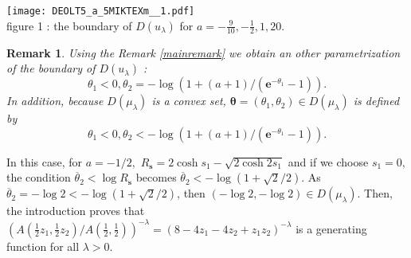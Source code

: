 \documentclass[a4paper,oneside,notitlepage]{article}%
\newtheorem{remark}[theorem]{Remark}
\begin{document}

\begin{center}
\texttt{[image: DEOLT5\_a\_5MIKTEXm\_\_1.pdf]}
\\
figure 1 : the boundary of $D\left(  u_{\lambda}\right)  $ for $a=-\frac
{9}{10},-\frac{1}{2},1,20.$%
\label{fig1}%



\end{center}


\begin{remark}
Using the Remark \ref{mainremark} we obtain an other parametrization of the
boundary of $D\left(  u_{\lambda}\right)  $ :
\[
\theta_{1}<0,\theta_{2}=-\log\left(  1+\left(  a+1\right)  /\left(
\mathbf{e}^{-\theta_{1}}-1\right)  \right)  .
\]
In addition, because $D\left(  \mu_{\lambda}\right)  $ is a convex set,
$\mathbf{\theta}=\left(  \theta_{1},\theta_{2}\right)  \in D\left(
\mu_{\lambda}\right)  $ is defined by
\begin{equation}
\theta_{1}<0,\theta_{2}<-\log\left(  1+\left(  a+1\right)  /\left(
\mathbf{e}^{-\theta_{1}}-1\right)  \right)  . \label{conditiondim2exemple}%
\end{equation}

\end{remark}

In this case, for $a=-1/2,$ $R_{\mathbf{s}}=2\cosh s_{1}-\sqrt{2\cosh2s_{1}}$
and if we choose $s_{1}=0,$ the condition $\overline{\theta}_{2}<\log
R_{\mathbf{s}}$ becomes $\overline{\theta}_{2}<-\log\left(  1+\sqrt
{2}/2\right)  .$ As $\overline{\theta}_{2}=-\log2<-\log\left(  1+\sqrt
{2}/2\right)  $, then $\left(  -\log2,-\log2\right)  \in D\left(  \mu
_{\lambda}\right)  $. Then, the introduction proves that $(A\left(  \frac
{1}{2}z_{1},\frac{1}{2}z_{2}\right)  /A\left(  \frac{1}{2},\frac{1}{2}\right)
)^{-\lambda}=\left(  8-4z_{1}-4z_{2}+z_{1}z_{2}\right)  ^{-\lambda}$ is a
generating function for all $\lambda>0$.
\end{document}
